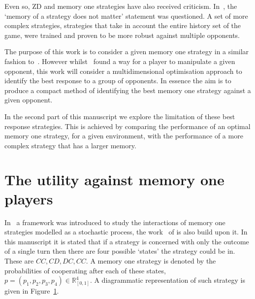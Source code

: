 \documentclass[10pt]{article}
\newcommand{\R}{\mathbb{R}}
\begin{document}
Even so, ZD and memory one strategies have also received criticism. In~\cite{Harper2015},
the `memory of a strategy does not matter' statement was questioned. A set of more
complex strategies, strategies that take in account the entire history set of the
game, were trained and proven to be more robust against multiple opponents.

The purpose of this work is to consider a given memory one strategy 
in a similar fashion to~\cite{Press2012}. However whilst~\cite{Press2012} found
a way for a player to manipulate a given opponent, this work will consider a multidimensional
optimisation approach to identify the best response to a group of opponents. In
essence the aim is to produce a compact method of identifying the best memory one
strategy against a given opponent.

In the second part of this manuscript we explore the limitation of these best response
strategies. This is achieved by comparing the performance of an optimal
memory one strategy, for a given environment, with the performance of a more complex
strategy that has a larger memory.

\section{The utility against memory one players}\label{section:utility_against_mem_one}

In~\cite{Nowak1989} a framework was introduced to study the interactions of memory
one strategies modelled as a stochastic process, the work~\cite{Press2012} of is
also build upon it. In this manuscript it is stated that if a strategy
is concerned with only the outcome of a single turn then there are four possible `states'
the strategy could be in. These are \(CC, CD, DC,CC\). A memory one strategy is denoted
by the probabilities of cooperating after each of these states,
\(p=(p_1, p_2, p_3, p_4) \in \R_{[0,1]} ^ 4\). A diagrammatic representation of
such strategy is given in Figure~\ref{fig:diagram_mem_one}.

\begin{figure}
    \centering
    \begin{subfigure}{0.45\textwidth}
        \centering
        
        \label{fig:diagram_mem_one}
    \end{subfigure}
    \begin{subfigure}{0.45\textwidth}
        \centering
        
        \label{fig:markov_chain}
    \end{subfigure}
\end{figure}
\end{document}
